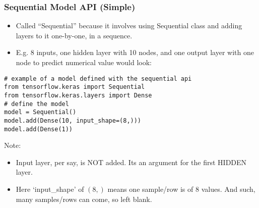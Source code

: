 \begin{frame}[fragile] \frametitle{Sequential Model API (Simple)}

\begin{itemize}
\item Called ``Sequential'' because it involves using Sequential class and adding layers to it one-by-one, in a sequence.
\item E.g. 8 inputs, one hidden layer with 10 nodes, and one output layer with one node to predict numerical value would look:
\end{itemize}

\begin{lstlisting}
# example of a model defined with the sequential api
from tensorflow.keras import Sequential
from tensorflow.keras.layers import Dense
# define the model
model = Sequential()
model.add(Dense(10, input_shape=(8,)))
model.add(Dense(1))
\end{lstlisting}

Note:
\begin{itemize}
\item Input layer, per say, is NOT added. Its an argument for the first HIDDEN layer.
\item Here `input\_shape' of $(8,)$ means one sample/row is of 8 values. And such, many samples/rows can come, so left blank.
\end{itemize}
\end{frame}



